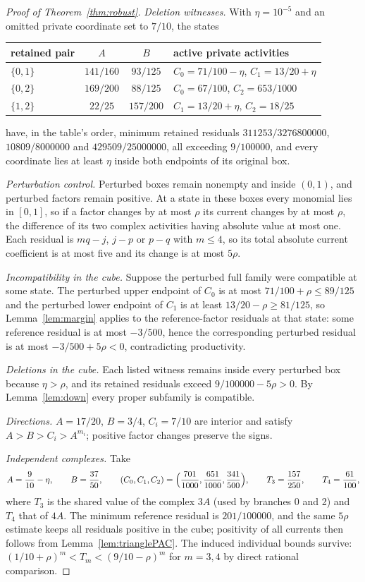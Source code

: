 \documentclass[11pt,a4paper]{article}
\theoremstyle{plain}
\theoremstyle{definition}
\theoremstyle{remark}
\begin{document}
\begin{proof}[Proof of Theorem~\ref{thm:robust}]
\emph{Deletion witnesses.} With $\eta=10^{-5}$ and an omitted private coordinate set to $7/10$, the states
\begin{center}
\begin{tabular}{@{}lccl@{}}
\toprule
retained pair & $A$ & $B$ & active private activities \\
\midrule
$\{0,1\}$ & $141/160$ & $93/125$ & $C_0=71/100-\eta$, $C_1=13/20+\eta$ \\
$\{0,2\}$ & $169/200$ & $88/125$ & $C_0=67/100$, $C_2=653/1000$ \\
$\{1,2\}$ & $22/25$ & $157/200$ & $C_1=13/20+\eta$, $C_2=18/25$ \\
\bottomrule
\end{tabular}
\end{center}
have, in the table's order, minimum retained residuals $311253/3276800000$, $10809/8000000$ and $429509/25000000$, all exceeding $9/100000$, and every coordinate lies at least $\eta$ inside both endpoints of its original box.

\emph{Perturbation control.} Perturbed boxes remain nonempty and inside $(0,1)$, and perturbed factors remain positive. At a state in these boxes every monomial lies in $[0,1]$, so if a factor changes by at most $\rho$ its current changes by at most $\rho$, the difference of its two complex activities having absolute value at most one. Each residual is $mq-j$, $j-p$ or $p-q$ with $m\le4$, so its total absolute current coefficient is at most five and its change is at most $5\rho$.

\emph{Incompatibility in the cube.} Suppose the perturbed full family were compatible at some state. The perturbed upper endpoint of $C_0$ is at most $71/100+\rho\le89/125$ and the perturbed lower endpoint of $C_1$ is at least $13/20-\rho\ge81/125$, so Lemma~\ref{lem:margin} applies to the reference-factor residuals at that state: some reference residual is at most $-3/500$, hence the corresponding perturbed residual is at most $-3/500+5\rho<0$, contradicting productivity.

\emph{Deletions in the cube.} Each listed witness remains inside every perturbed box because $\eta>\rho$, and its retained residuals exceed $9/100000-5\rho>0$. By Lemma~\ref{lem:down} every proper subfamily is compatible.

\emph{Directions.} $A=17/20$, $B=3/4$, $C_i=7/10$ are interior and satisfy $A>B>C_i>A^{m_i}$; positive factor changes preserve the signs.

\emph{Independent complexes.} Take
\[
A=\frac{9}{10}-\eta,\qquad B=\frac{37}{50},\qquad (C_0,C_1,C_2)=\Bigl(\frac{701}{1000},\frac{651}{1000},\frac{341}{500}\Bigr),\qquad T_3=\frac{157}{250},\qquad T_4=\frac{61}{100},
\]
where $T_3$ is the shared value of the complex $3A$ (used by branches 0 and 2) and $T_4$ that of $4A$. The minimum reference residual is $201/100000$, and the same $5\rho$ estimate keeps all residuals positive in the cube; positivity of all currents then follows from Lemma~\ref{lem:trianglePAC}. The induced individual bounds survive: $(1/10+\rho)^m<T_m<(9/10-\rho)^m$ for $m=3,4$ by direct rational comparison.
\end{proof}
\end{document}
